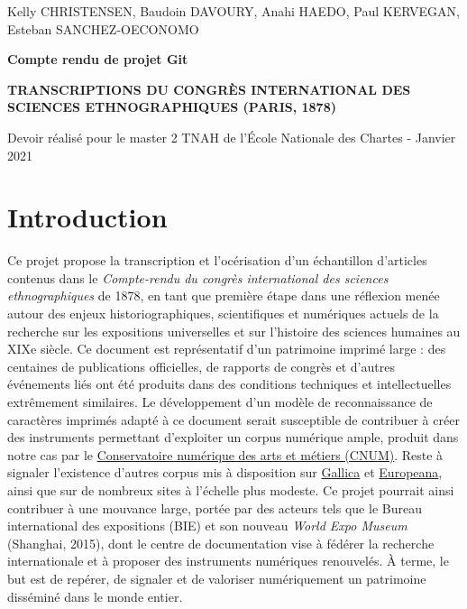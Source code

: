\documentclass{article}
\begin{document}
	\begin{titlepage}
		\begin{center}
			\large
			Kelly CHRISTENSEN, Baudoin DAVOURY, Anahi HAEDO, Paul KERVEGAN, Esteban SANCHEZ-OECONOMO
			
			\huge
			\vfill
				\textbf{Compte rendu de projet Git}
			
				\textbf{TRANSCRIPTIONS DU CONGRÈS INTERNATIONAL DES SCIENCES ETHNOGRAPHIQUES (PARIS, 1878)}
			\vfill
				
			\large	
			\vfill Devoir réalisé pour le master 2 TNAH de l'École Nationale des Chartes - Janvier 2021
		\end{center}
	\end{titlepage}

	\section{Introduction}
	
	Ce projet propose la transcription et l'océrisation d’un échantillon d’articles contenus dans le \textit{Compte-rendu du congrès international des sciences ethnographiques} de 1878, en tant que première étape dans une réflexion menée autour des enjeux historiographiques, scientifiques et numériques actuels de la recherche sur les expositions universelles et sur l’histoire des sciences humaines au XIXe siècle. Ce document est représentatif d’un patrimoine imprimé large : des centaines de publications officielles, de rapports de congrès et d’autres événements liés ont été produits dans des conditions techniques et intellectuelles extrêmement similaires. Le développement d’un modèle de reconnaissance de caractères imprimés adapté à ce document serait susceptible de contribuer à créer des instruments permettant d’exploiter un corpus numérique ample, produit dans notre cas par le \href{http://cnum.cnam.fr/thematiques/fr/1.expositions\_universelles/cata\_auteurs.php}{Conservatoire numérique des arts et métiers (CNUM)}. Reste à signaler l’existence d’autres corpus mis à disposition sur \href{https://gallica.bnf.fr/accueil/es/content/accueil-es?mode=desktop}{Gallica} et \href{https://www.europeana.eu/fr}{Europeana}, ainsi que sur de nombreux sites à l'échelle plus modeste. Ce projet pourrait ainsi contribuer à une mouvance large, portée par des acteurs tels que le Bureau international des expositions (BIE) et son nouveau \textit{World Expo Museum} (Shanghai, 2015), dont le centre de documentation vise à fédérer la recherche internationale et à proposer des instruments numériques renouvelés. À terme, le but est de repérer, de signaler et de valoriser numériquement un patrimoine disséminé dans le monde entier. 
	
\end{document}
